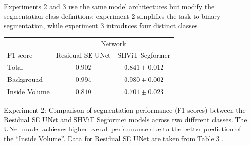 \medskip

Experiments 2 and 3 use the same model architectures but modify the segmentation class definitions: experiment 2 simplifies the task to binary segmentation, while experiment 3 introduces four distinct classes.

\begin{center}
	\begin{threeparttable}[H]
		\begin{tabular}{lcc}
			\toprule[1.5pt]  
			& \multicolumn{2}{c}{Network} \\
			\multicolumn{1}{l}{F1-score} & {Residual SE UNet} & {SHViT Segformer} \\
			\midrule
			\midrule
			Total         & $0.902$ & $0.841 \pm 0.012$ \\
			\midrule
			Background    & $0.994$ & $0.980 \pm 0.002$ \\
			Inside Volume & $0.810$ & $0.701 \pm 0.023$ \\
			\bottomrule
		\end{tabular}
		\captionsetup{width=0.95\textwidth}
		\caption[Comparison of segmentation performance (F1-scores) between the Residual SE UNet and SHViT Segformer models across two different classes]{Experiment 2: Comparison of segmentation performance (F1-scores) between the Residual SE UNet and SHViT Segformer models across two different classes. The UNet model achieves higher overall performance due to the better prediction of the \enquote{Inside Volume}. Data for Residual SE UNet are taken from Table 3 \cite{contribution_martin_leipert}.}
		\label{tab:paper_2_segments}
	\end{threeparttable}
\end{center}

